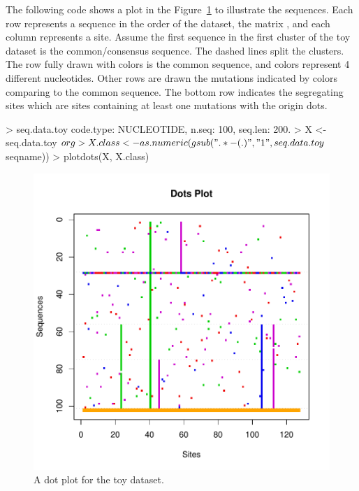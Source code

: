 The following code shows a plot in the Figure~\ref{fig:toydots}
to illustrate the sequences.
Each row represents a sequence in the order of the dataset,
the matrix , and each column represents a site.
Assume the first sequence in the first cluster of the toy dataset
is the common/consensus sequence.
The dashed lines split the clusters.
The row fully drawn with colors is the common sequence,
and colors represent 4 different nucleotides.
Other rows are drawn the mutations indicated by colors
comparing to the common sequence.
The bottom row indicates the segregating sites which are sites containing
at least one mutations with the origin dots.
\begin{Code}
> seq.data.toy
code.type: NUCLEOTIDE, n.seq: 100, seq.len: 200.
> X <- seq.data.toy$org
> X.class <- as.numeric(gsub(".*-(.)", "\\1", seq.data.toy$seqname))
> plotdots(X, X.class)
\end{Code}
\begin{figure}[h]
\begin{center}
\includegraphics[width=5.0in]{./phyclust-graph/toydots}
\caption{A dot plot for the toy dataset.}
\label{fig:toydots}
\end{center}
\end{figure}

